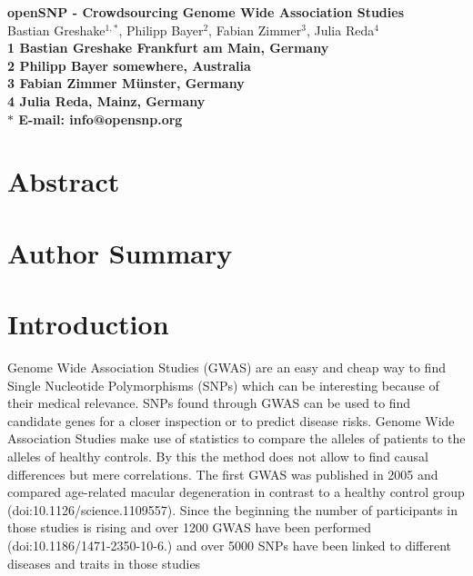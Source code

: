 \documentclass[10pt]{article}
\date{}
\begin{document}
\begin{flushleft}
{\Large
\textbf{openSNP - Crowdsourcing Genome Wide Association Studies}
}
\\
Bastian Greshake$^{1,\ast}$, 
Philipp Bayer$^{2}$, 
Fabian Zimmer$^{3}$,
Julia Reda$^{4}$
\\
\bf{1} Bastian Greshake Frankfurt am Main, Germany
\\
\bf{2} Philipp Bayer somewhere, Australia
\\
\bf{3} Fabian Zimmer M\"unster, Germany
\\
\bf{4} Julia Reda, Mainz, Germany
\\
$\ast$ E-mail: info@opensnp.org
\end{flushleft}

\section*{Abstract}

\section*{Author Summary}

\section*{Introduction}
Genome Wide Association Studies (GWAS) are an easy and cheap way to find Single Nucleotide Polymorphisms (SNPs) which can be interesting because of their medical relevance. SNPs found through GWAS can be used to find candidate genes for a closer inspection or to predict disease risks. Genome Wide Association Studies make use of statistics to compare the alleles of patients to the alleles of healthy controls. By this the method does not allow to find causal differences but mere correlations. The first GWAS was published in 2005 and compared age-related macular degeneration in contrast to a healthy control group (doi:10.1126/science.1109557). Since the beginning the number of participants in those studies is rising and over 1200 GWAS have been performed (doi:10.1186/1471-2350-10-6.) and over 5000 SNPs have been linked to different diseases and traits in those studies %
\end{document}
